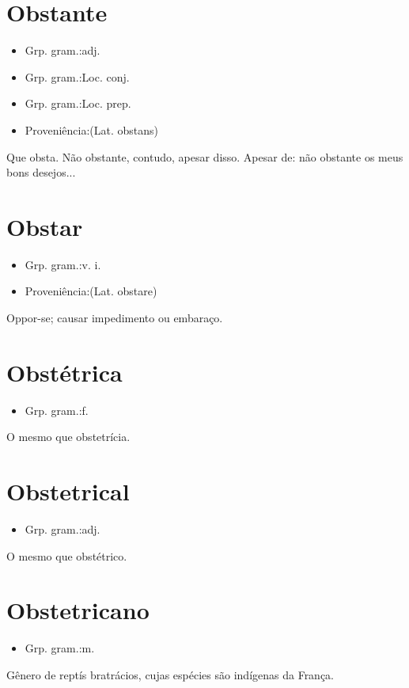 \section{Obstante}
\begin{itemize}
\item {Grp. gram.:adj.}
\end{itemize}
\begin{itemize}
\item {Grp. gram.:Loc. conj.}
\end{itemize}
\begin{itemize}
\item {Grp. gram.:Loc. prep.}
\end{itemize}
\begin{itemize}
\item {Proveniência:(Lat. \textunderscore obstans\textunderscore )}
\end{itemize}
Que obsta.
\textunderscore Não obstante\textunderscore , contudo, apesar disso.
Apesar de: \textunderscore não obstante os meus bons desejos...\textunderscore 
\section{Obstar}
\begin{itemize}
\item {Grp. gram.:v. i.}
\end{itemize}
\begin{itemize}
\item {Proveniência:(Lat. \textunderscore obstare\textunderscore )}
\end{itemize}
Oppor-se; causar impedimento ou embaraço.
\section{Obstétrica}
\begin{itemize}
\item {Grp. gram.:f.}
\end{itemize}
O mesmo que \textunderscore obstetrícia\textunderscore .
\section{Obstetrical}
\begin{itemize}
\item {Grp. gram.:adj.}
\end{itemize}
O mesmo que \textunderscore obstétrico\textunderscore .
\section{Obstetricano}
\begin{itemize}
\item {Grp. gram.:m.}
\end{itemize}
Gênero de reptís bratrácios, cujas espécies são indígenas da França.
